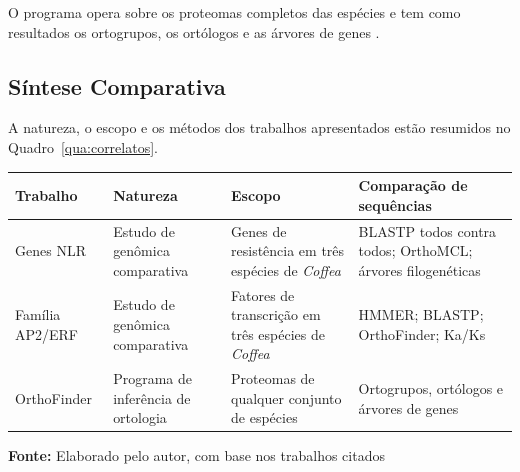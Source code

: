 O programa opera sobre os proteomas completos das espécies e tem como resultados os ortogrupos, os ortólogos e as árvores de genes \cite{EmmsKelly2019}.

\subsection{Síntese Comparativa}

A natureza, o escopo e os métodos dos trabalhos apresentados estão resumidos no Quadro~\ref{qua:correlatos}.

\FloatBarrier
\begin{quadro}[!htbp]
	\centering
	\SingleSpacing\footnotesize
	\caption{Síntese comparativa dos trabalhos correlatos}
	\begin{tabularx}{\textwidth}{|>{\raggedright\arraybackslash}p{2.8cm}|>{\raggedright\arraybackslash}p{2.6cm}|>{\raggedright\arraybackslash}X|>{\raggedright\arraybackslash}X|}
		\hline
		\textbf{Trabalho} & \textbf{Natureza} & \textbf{Escopo} & \textbf{Comparação de sequências} \\ \hline
		Genes NLR \cite{Santos2022} & Estudo de genômica comparativa & Genes de resistência em três espécies de \textit{Coffea} & BLASTP todos contra todos; OrthoMCL; árvores filogenéticas \\ \hline
		Família AP2/ERF \cite{Park2025} & Estudo de genômica comparativa & Fatores de transcrição em três espécies de \textit{Coffea} & HMMER; BLASTP; OrthoFinder; Ka/Ks \\ \hline
		OrthoFinder \cite{EmmsKelly2019} & Programa de inferência de ortologia & Proteomas de qualquer conjunto de espécies & Ortogrupos, ortólogos e árvores de genes \\ \hline
	\end{tabularx}
	\par\vspace{0.2cm}
	\textbf{Fonte:} Elaborado pelo autor, com base nos trabalhos citados
	\label{qua:correlatos}
\end{quadro}
\FloatBarrier
